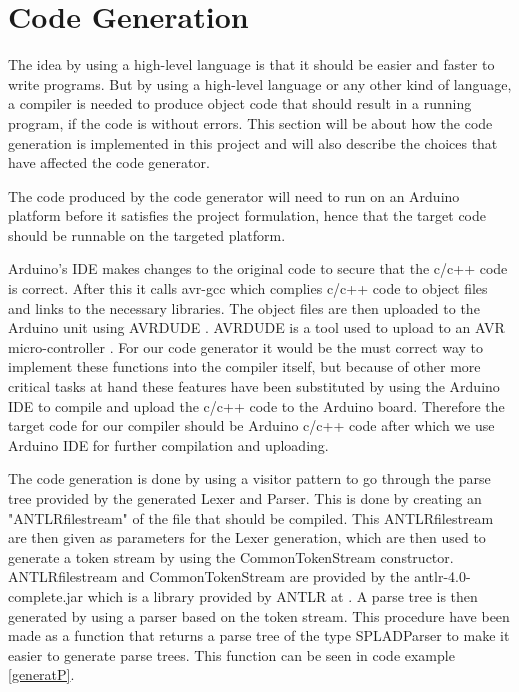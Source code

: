 \section{Code Generation}
The idea by using a high-level language is that it should be easier and faster to write programs. But by using a high-level language or any other kind of language, a compiler is needed to produce object code that should result in a running program, if the code is without errors. This section will be about how the code generation is implemented in this project and will also describe the choices that have affected the code generator.

The code produced by the code generator will need to run on an Arduino platform before it satisfies the project formulation, hence that the target code should be runnable on the targeted platform.

Arduino's IDE makes changes to the original code to secure that the c/c++ code is correct. After this it calls avr-gcc which complies c/c++ code to object files and links to the necessary libraries. The object files are then uploaded to the Arduino unit using AVRDUDE \citep{Buildproc}. AVRDUDE is a tool used to upload to an AVR micro-controller \citep{AVRDUDE}. For our code generator it would be the must correct way to implement these functions into the compiler itself, but because of other more critical tasks at hand these features have been substituted by using the Arduino IDE to compile and upload the c/c++ code to the Arduino board. Therefore the target code for our compiler should be Arduino c/c++ code after which we use Arduino IDE for further compilation and uploading.


The code generation is done by using a visitor pattern to go through the parse tree provided by the generated Lexer and Parser. This is done by creating an "ANTLRfilestream" of the file that should be compiled. This ANTLRfilestream are then given as parameters for the Lexer generation, which are then used to generate a token stream by using the CommonTokenStream constructor. ANTLRfilestream and CommonTokenStream are provided by the antlr-4.0-complete.jar which is a library provided by ANTLR at \citep{DownloadANTLR}. A parse tree is then generated by using a parser based on the token stream. This procedure have been made as a function that returns a parse tree of the type SPLADParser to make it easier to generate parse trees. This function can be seen in code example \ref{generatP}.

